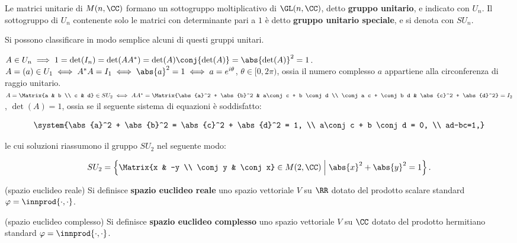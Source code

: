 \documentclass[11pt]{article}
\begin{document}
	\begin{definition}
		Le matrici unitarie di $M(n, \CC)$ formano un sottogruppo moltiplicativo di $\GL(n, \CC)$, detto \textbf{gruppo unitario},
		e indicato con $U_n$. Il sottogruppo di $U_n$ contenente solo le matrici con determinante pari a $1$ è
		detto \textbf{gruppo unitario speciale}, e si denota con $SU_n$.
	\end{definition}

	\begin{remark}\nl
		Si possono classificare in modo semplice alcuni di questi gruppi unitari.
		
		\li $A \in U_n \implies 1 = \det(I_n) = \det(A A^*) = \det(A) \conj{\det(A)} = \abs{\det(A)}^2 = 1$.
		\li $A = (a) \in U_1 \iff A^* A = I_1 \iff \abs{a}^2 = 1 \iff a = e^{i\theta}$, $\theta \in [0, 2\pi)$, ossia il numero complesso $a$ appartiene alla circonferenza di raggio unitario.
		\li $A = \Matrix{a & b \\ c & d} \in SU_2 \iff A A^* = \Matrix{\abs{a}^2 + \abs{b}^2 & a\conj c + b \conj d \\ \conj a c + \conj b d & \abs{c}^2 + \abs{d}^2} = I_2$, $\det(A) = 1$, ossia se il seguente
		sistema di equazioni è soddisfatto:
		
		\[ \system{\abs{a}^2 + \abs{b}^2 = \abs{c}^2 + \abs{d}^2 = 1, \\ a\conj c + b \conj d = 0, \\ ad-bc=1,} \]
		
		le cui soluzioni riassumono il gruppo $SU_2$ nel seguente modo:
		
		\[ SU_2 = \left\{ \Matrix{x & -y \\ \conj y & \conj x} \in M(2, \CC) \;\middle\vert\; \abs{x}^2 + \abs{y}^2 = 1 \right\}. \]

	\end{remark}

	\begin{definition} (spazio euclideo reale)
		Si definisce \textbf{spazio euclideo reale} uno spazio vettoriale $V$ su $\RR$ dotato
		del prodotto scalare standard $\varphi = \innprod{\cdot, \cdot}$.
	\end{definition}

	\begin{definition} (spazio euclideo complesso)
		Si definisce \textbf{spazio euclideo complesso} uno spazio vettoriale $V$ su $\CC$ dotato
		del prodotto hermitiano standard $\varphi = \innprod{\cdot, \cdot}$.
	\end{definition}
\end{document}
